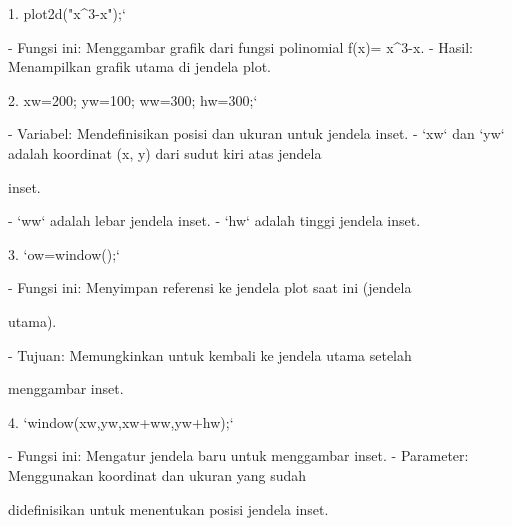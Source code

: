 \documentclass{article}
\begin{document}
\begin{eulernotebook}
\begin{eulercomment}
\begin{eulercomment}
\begin{eulercomment}
\begin{eulercomment}
\begin{eulercomment}
1. plot2d("x\textasciicircum{}3-x");`\\
\end{eulercomment}
\begin{eulerttcomment}
  - Fungsi ini: Menggambar grafik dari fungsi polinomial f(x)= x^3-x.
  - Hasil: Menampilkan grafik utama di jendela plot.
\end{eulerttcomment}
\begin{eulercomment}

2. xw=200; yw=100; ww=300; hw=300;`\\
\end{eulercomment}
\begin{eulerttcomment}
  - Variabel: Mendefinisikan posisi dan ukuran untuk jendela inset.
  - `xw` dan `yw` adalah koordinat (x, y) dari sudut kiri atas jendela
\end{eulerttcomment}
\begin{eulercomment}
inset.\\
\end{eulercomment}
\begin{eulerttcomment}
  - `ww` adalah lebar jendela inset.
  - `hw` adalah tinggi jendela inset.
\end{eulerttcomment}
\begin{eulercomment}

3. `ow=window();`\\
\end{eulercomment}
\begin{eulerttcomment}
   - Fungsi ini: Menyimpan referensi ke jendela plot saat ini (jendela
\end{eulerttcomment}
\begin{eulercomment}
utama).\\
\end{eulercomment}
\begin{eulerttcomment}
   - Tujuan: Memungkinkan untuk kembali ke jendela utama setelah
\end{eulerttcomment}
\begin{eulercomment}
menggambar inset.

4. `window(xw,yw,xw+ww,yw+hw);`\\
\end{eulercomment}
\begin{eulerttcomment}
  - Fungsi ini: Mengatur jendela baru untuk menggambar inset.
  - Parameter: Menggunakan koordinat dan ukuran yang sudah
\end{eulerttcomment}
\begin{eulercomment}
didefinisikan untuk menentukan posisi jendela inset.


\end{eulercomment}
\end{eulercomment}
\end{eulercomment}
\end{eulercomment}
\end{eulercomment}
\end{eulernotebook}
\end{document}

